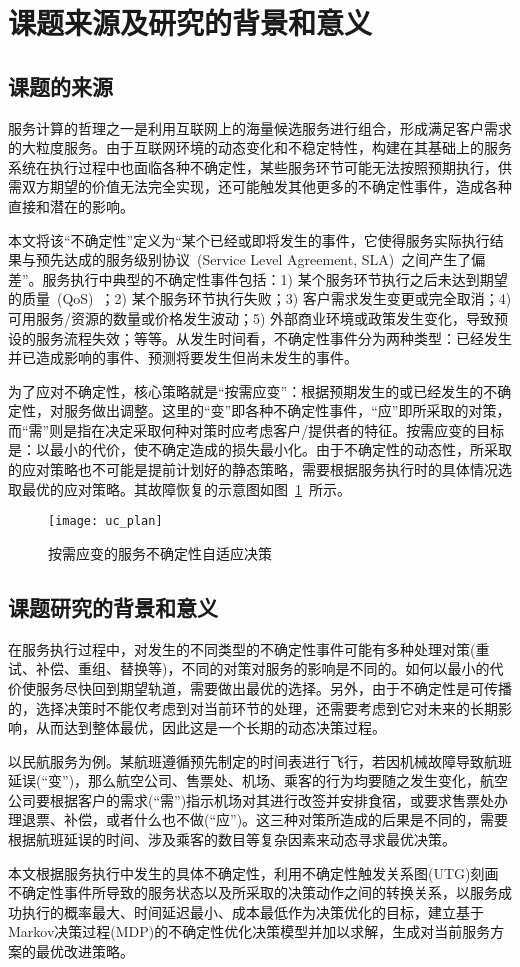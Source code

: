 \section{课题来源及研究的背景和意义}
\subsection{课题的来源}
服务计算的哲理之一是利用互联网上的海量候选服务进行组合，形成满足客户需求的大粒度服务。由于互联网环境的动态变化和不稳定特性，构建在其基础上的服务系统在执行过程中也面临各种不确定性，某些服务环节可能无法按照预期执行，供需双方期望的价值无法完全实现，还可能触发其他更多的不确定性事件，造成各种直接和潜在的影响。

本文将该“不确定性”定义为“某个已经或即将发生的事件，它使得服务实际执行结果与预先达成的服务级别协议~(Service Level Agreement, SLA)~之间产生了偏差”。服务执行中典型的不确定性事件包括：1) 某个服务环节执行之后未达到期望的质量~(QoS)~；2) 某个服务环节执行失败；3) 客户需求发生变更或完全取消；4) 可用服务/资源的数量或价格发生波动；5) 外部商业环境或政策发生变化，导致预设的服务流程失效；等等。从发生时间看，不确定性事件分为两种类型：已经发生并已造成影响的事件、预测将要发生但尚未发生的事件。

为了应对不确定性，核心策略就是“按需应变”：根据预期发生的或已经发生的不确定性，对服务做出调整。这里的“变”即各种不确定性事件，“应”即所采取的对策，而“需”则是指在决定采取何种对策时应考虑客户/提供者的特征。按需应变的目标是：以最小的代价，使不确定造成的损失最小化。由于不确定性的动态性，所采取的应对策略也不可能是提前计划好的静态策略，需要根据服务执行时的具体情况选取最优的应对策略。其故障恢复的示意图如图~\ref{uc_plan}~所示。
\begin{figure}[htbp]
\centering
\texttt{[image: uc\_plan]}
\caption{按需应变的服务不确定性自适应决策}\label{uc_plan}
\vspace{-1em}
\end{figure}

\subsection{课题研究的背景和意义}

在服务执行过程中，对发生的不同类型的不确定性事件可能有多种处理对策(重试、补偿、重组、替换等)，不同的对策对服务的影响是不同的。如何以最小的代价使服务尽快回到期望轨道，需要做出最优的选择。另外，由于不确定性是可传播的，选择决策时不能仅考虑到对当前环节的处理，还需要考虑到它对未来的长期影响，从而达到整体最优，因此这是一个长期的动态决策过程。

以民航服务为例。某航班遵循预先制定的时间表进行飞行，若因机械故障导致航班延误(“变”)，那么航空公司、售票处、机场、乘客的行为均要随之发生变化，航空公司要根据客户的需求(“需”)指示机场对其进行改签并安排食宿，或要求售票处办理退票、补偿，或者什么也不做(“应”)。这三种对策所造成的后果是不同的，需要根据航班延误的时间、涉及乘客的数目等复杂因素来动态寻求最优决策。

本文根据服务执行中发生的具体不确定性，利用不确定性触发关系图(UTG)刻画不确定性事件所导致的服务状态以及所采取的决策动作之间的转换关系，以服务成功执行的概率最大、时间延迟最小、成本最低作为决策优化的目标，建立基于Markov决策过程(MDP)的不确定性优化决策模型并加以求解，生成对当前服务方案的最优改进策略。
